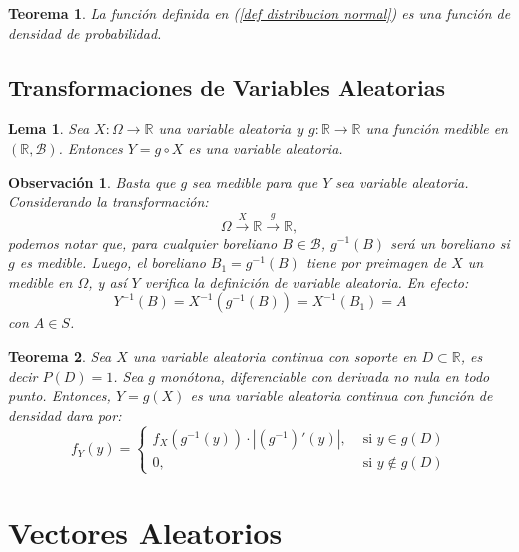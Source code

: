 \documentclass{report}
\newtheorem{thm}{Teorema}[section]
\newtheorem{lem}{Lema}[section]
\newtheorem{obs}{Observación}[section]
\begin{document}
\begin{thm}
La función definida en (\ref{def distribucion normal}) es una función de densidad de probabilidad.
\end{thm}


\subsection{Transformaciones de Variables Aleatorias}

\begin{lem}
    Sea $X:\Omega\rightarrow \mathbb{R}$ una variable aleatoria y $g:\mathbb{R}\rightarrow\mathbb{R}$ una función medible en $(\mathbb{R},\mathcal{B})$.
    Entonces $Y = g\circ X$ es una variable aleatoria.
\end{lem}

\begin{obs}
    Basta que $g$ sea medible para que $Y$ sea variable aleatoria. Considerando la transformación:
    \begin{equation*}
        \Omega \xrightarrow{X} \mathbb{R} \xrightarrow{g} \mathbb{R},
    \end{equation*}
    podemos notar que, para cualquier boreliano $B\in\mathcal{B}$, $g^{-1}(B)$ será un boreliano si $g$ es medible.
    Luego, el boreliano $B_1 = g^{-1}(B)$ tiene por preimagen de $X$ un medible en $\Omega$, y así $Y$ verifica la definición de variable aleatoria.
    En efecto:
    \begin{equation*}
        Y^{-1}(B) = X^{-1}(g^{-1}(B)) = X^{-1}(B_1) = A
    \end{equation*}
    con $A\in S$.
\end{obs}

\begin{thm}
    Sea $X$ una variable aleatoria continua con soporte en $D\subset\mathbb{R}$, es decir $P(D)=1$. Sea $g$ monótona, diferenciable con derivada no nula en
    todo punto. Entonces, $Y=g(X)$ es una variable aleatoria continua con función de densidad dara por:
    \begin{equation*}
        f_Y(y)=\begin{cases}
            f_X(g^{-1}(y)) \cdot |(g^{-1})'(y)|, &\text{ si } y\in g(D)\\
            0, & \text{ si } y\notin g(D)
        \end{cases}
    \end{equation*}
\end{thm}

\section{Vectores Aleatorios}
\end{document}

